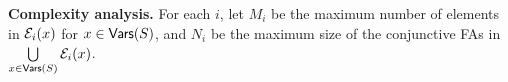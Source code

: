 {\smallskip
\noindent
\textbf{Complexity analysis.}
For each $i$, 
let $M_i$ be the maximum number of elements in $\mathcal{E}_i(x)$ for $x  \in \mathsf{Vars}(S)$,
and $N_i$ be the maximum size of the conjunctive FAs in $\bigcup \limits_{x \in \mathsf{Vars}(S)} \mathcal{E}_i(x)$.
%

}
